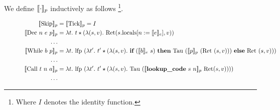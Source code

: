 \documentclass{article}
\begin{document}
We define $\llbracket \cdot \rrbracket_{p}$ inductively as follows \footnote{Where $I$ denotes the identity function.}.
\begin{figure}[H]
  \begin{align*}
    \sem{\text{Skip}}_{p} &= \sem{\text{Tick}}_{p} = I\\
    \sem{\text{Dec}\ n\ e\ p}_{p} &= \lambda t.\ t \star (\lambda (s,v).\ \text{Ret}(s.\text{locals}[n := \sem{e}_{e}], v))\\
    \dots\\
    \sem{\text{While}\ b\ p}_{p} &= \lambda t.\ \text{lfp}\ (\lambda t'.\ t' \star (\lambda (s,v).\ \textbf{if}\ (\sem{b}_{e}\ s)\ \textbf{then}\ \text{Tau}\ (\sem{p}_{p}\ (\text{Ret}\ (s,v)))\ \textbf{else}\ \text{Ret}\ (s,v)))\\
    \dots\\
    \sem{\text{Call}\ t\ n\ a}_{p} &= \lambda t.\ \text{lfp}\ (\lambda t'.\ t' \star (\lambda (s,v).\ \text{Tau}\ (\sem{\textbf{lookup\_code}\ s\ n}_{p}\ \text{Ret} (s,v))))\\
    \dots

\end{align*}
\end{figure}
\end{document}
